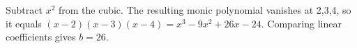 Subtract $x^2$ from the cubic. The resulting monic polynomial vanishes at 2,3,4, so it equals $(x-2)(x-3)(x-4)=x^3-9x^2+26x-24$. Comparing linear coefficients gives $\boxed{b=26}$.
